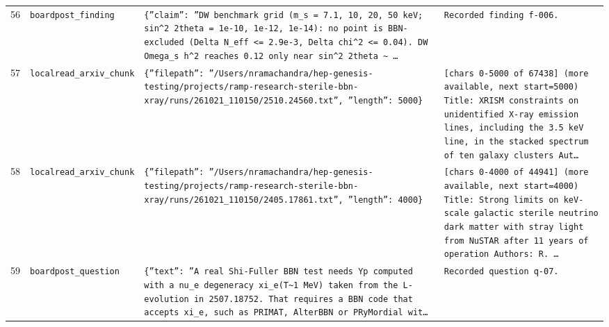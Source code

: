 \documentclass[11pt,a4paper]{article}
\begin{document}
\begin{longtable}{@{}p{}p{}p{}p{}@{}}
56 & \texttt{board}\newline\texttt{post\_\allowbreak{}finding} & \texttt{\{''claim'':\allowbreak{} ''DW benchmark grid (m\_\allowbreak{}s =\allowbreak{} 7.1,\allowbreak{} 10,\allowbreak{} 20,\allowbreak{} 50 keV;\allowbreak{} sin\textasciicircum{}\allowbreak{}2 2theta =\allowbreak{} 1e-10,\allowbreak{} 1e-12,\allowbreak{} 1e-14)\allowbreak{}:\allowbreak{} no point is BBN-excluded (Delta N\_\allowbreak{}eff \textless{}\allowbreak{}=\allowbreak{} 2.9e-3,\allowbreak{} \textbar{}\allowbreak{}Delta chi\textasciicircum{}\allowbreak{}2\textbar{}\allowbreak{} \textless{}\allowbreak{}=\allowbreak{} 0.04)\allowbreak{}. DW Omega\_\allowbreak{}s h\textasciicircum{}\allowbreak{}2 reaches 0.12 only near sin\textasciicircum{}\allowbreak{}2 2theta \textasciitilde{}\allowbreak{} \ldots{}\allowbreak{}} & \texttt{Recorded finding f-006.} \\
57 & \texttt{local}\newline\texttt{read\_\allowbreak{}arxiv\_\allowbreak{}chunk} & \texttt{\{''filepath'':\allowbreak{} ''/\allowbreak{}Users/\allowbreak{}nramachandra/\allowbreak{}hep-genesis-testing/\allowbreak{}projects/\allowbreak{}ramp-research-sterile-bbn-xray/\allowbreak{}runs/\allowbreak{}261021\_\allowbreak{}110150/\allowbreak{}2510.24560.txt'',\allowbreak{} ''length'':\allowbreak{} 5000\}\allowbreak{}} & \texttt{[chars 0-5000 of 67438]\allowbreak{} (more available,\allowbreak{} next start=\allowbreak{}5000)\allowbreak{}  Title:\allowbreak{} XRISM constraints on unidentified X-ray emission lines,\allowbreak{} including the 3.5 keV line,\allowbreak{} in the stacked spectrum of ten galaxy clusters Aut\ldots{}\allowbreak{}} \\
58 & \texttt{local}\newline\texttt{read\_\allowbreak{}arxiv\_\allowbreak{}chunk} & \texttt{\{''filepath'':\allowbreak{} ''/\allowbreak{}Users/\allowbreak{}nramachandra/\allowbreak{}hep-genesis-testing/\allowbreak{}projects/\allowbreak{}ramp-research-sterile-bbn-xray/\allowbreak{}runs/\allowbreak{}261021\_\allowbreak{}110150/\allowbreak{}2405.17861.txt'',\allowbreak{} ''length'':\allowbreak{} 4000\}\allowbreak{}} & \texttt{[chars 0-4000 of 44941]\allowbreak{} (more available,\allowbreak{} next start=\allowbreak{}4000)\allowbreak{}  Title:\allowbreak{} Strong limits on keV-scale galactic sterile neutrino dark matter with stray light from NuSTAR after 11 years of operation Authors:\allowbreak{} R. \ldots{}\allowbreak{}} \\
59 & \texttt{board}\newline\texttt{post\_\allowbreak{}question} & \texttt{\{''text'':\allowbreak{} ''A real Shi-Fuller BBN test needs Yp computed with a nu\_\allowbreak{}e degeneracy xi\_\allowbreak{}e(T\textasciitilde{}\allowbreak{}1 MeV)\allowbreak{} taken from the L-evolution in 2507.18752. That requires a BBN code that accepts xi\_\allowbreak{}e,\allowbreak{} such as PRIMAT,\allowbreak{} AlterBBN or PRyMordial wit\ldots{}\allowbreak{}} & \texttt{Recorded question q-07.} \\

\end{longtable}
\end{document}
